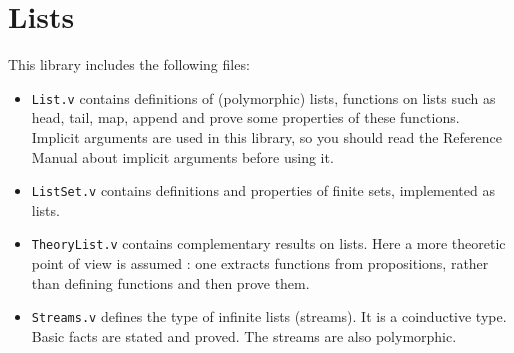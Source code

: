 \section{Lists}\label{Lists}

This library includes the following files:

\begin{itemize}

\item {\tt List.v} contains definitions of (polymorphic) lists, 
  functions on lists such as head, tail, map, append and prove some
  properties of these functions. Implicit arguments are used in this
  library, so you should read the Reference Manual about implicit
  arguments before using it.

\item {\tt ListSet.v} contains definitions and properties of finite
  sets, implemented as lists.

\item {\tt TheoryList.v} contains complementary results on lists. Here
  a more theoretic point of view is assumed : one extracts functions
  from propositions, rather than defining functions and then prove them.

\item {\tt Streams.v} defines the type of infinite lists (streams). It is a
  coinductive type. Basic facts are stated and proved. The streams are
  also polymorphic.

\end{itemize}
